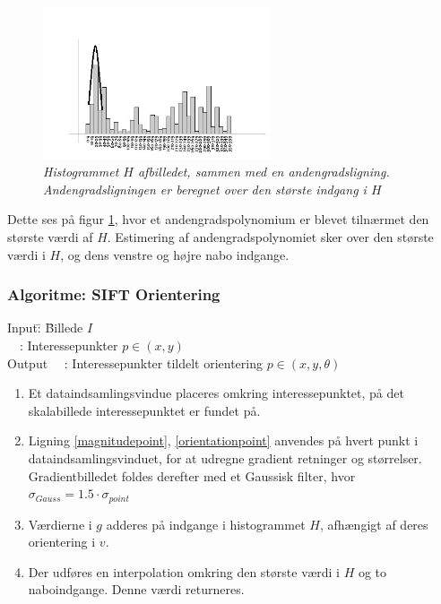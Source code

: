 \begin{figure}[H]
    \centering
    \includegraphics[width=0.60\textwidth]{fig/sift-orientation-histogram.jpg}
     \vspace{-1em}
    \begin{center}    
       \caption{{\footnotesize \textit{Histogrammet $H$ afbilledet, sammen med en andengradsligning. Andengradsligningen er beregnet over den største indgang i $H$}}}
    \label{histogramheight}
     \end{center}
     \vspace{-2.5em}
  \end{figure} \noindent
Dette ses på figur \ref{histogramheight}, hvor et andengradspolynomium er blevet tilnærmet den største værdi af $H$. Estimering af andengradspolynomiet sker over den største værdi i $H$, og dens venstre og højre nabo indgange.


\subsubsection*{Algoritme: SIFT Orientering}
\begin{tabbing}
Input\quad \= : \= Billede $I$\\
$\text{ }$ \> : \> Interessepunkter $p  \in (x, y)$ \\
Output $\text{ }$ \> : \> Interessepunkter tildelt orientering $p \in (x,y, \theta)$
\end{tabbing}
\begin{enumerate}
\item Et dataindsamlingsvindue placeres omkring interessepunktet, på det skalabillede interessepunktet er fundet på.
\item Ligning \eqref{magnitudepoint}, \eqref{orientationpoint} anvendes på hvert punkt i dataindsamlingsvinduet, for at udregne gradient retninger og størrelser. Gradientbilledet foldes derefter med et Gaussisk filter, hvor $\sigma_{Gauss} = 1.5 \cdot \sigma_{point}$
\item Værdierne i $g$ adderes på indgange i histogrammet $H$, afhængigt af deres orientering i $v$.
\item  Der udføres en interpolation omkring den største værdi i $H$ og to naboindgange. Denne værdi returneres.
\end{enumerate}
